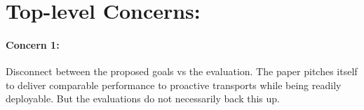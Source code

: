 \documentclass[12pt,one-column]{article}
\begin{document}
%
%
%
 

\setlength{\parskip}{0.1em}
\section{Top-level Concerns: }
{\it \paragraph{Concern 1:} Disconnect between the proposed goals vs the evaluation. The paper pitches itself to deliver comparable performance to proactive transports while being readily deployable. But the evaluations do not necessarily back this up.  }
\end{document}
